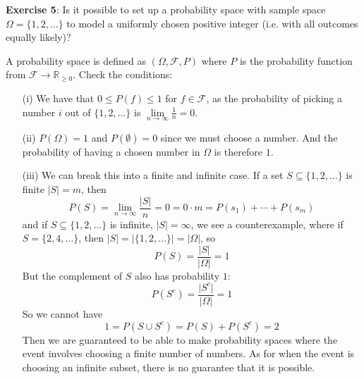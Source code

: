 \documentclass{article}
\begin{document}
\newpage

\textbf{Exercise 5}: Is it possible to set up a probability space with sample space $\Omega = \{1, 2, \ldots\}$ to model a uniformly chosen positive integer (i.e. with all outcomes equally likely)?
    \begin{answer}
        A probability space is defined as $(\Omega, \mathcal{F}, P)$ where $P$ is the probability function from $\mathcal{F} \rightarrow \mathbb{R}_{\geq 0}$. Check the conditions:
            \begin{itemize}
                \item [(i)] We have that $0 \leq P(f) \leq 1$ for $f \in \mathcal{F}$, as the probability of picking a number $i$ out of $\{1, 2, \ldots\}$ is $\lim\limits_{n \to \infty}\frac{1}{n} = 0$. 

                \item [(ii)] $P(\Omega) = 1$ and $P(\emptyset) = 0$ since we must choose a number. And the probability of having a chosen number in $\Omega$ is therefore $1$.

                \item [(iii)] We can break this into a finite and infinite case. If a set $S \subseteq \{1, 2, \ldots\}$ is finite $\lvert S \rvert = m$, then 
                    \begin{equation*}
                        P(S) = \lim\limits_{n \to \infty} \dfrac{\lvert S \rvert}{n} = 0 = 0 \cdot m = P(s_{1}) + \cdots + P(s_{m})
                    \end{equation*}
                and if $S \subseteq \{1, 2, \ldots\}$ is infinite, $\lvert S \rvert = \infty$, we see a counterexample, where if $S = \{2, 4, \ldots\}$, then $\lvert S \rvert = \lvert \{1, 2, \ldots\} \rvert = \lvert \Omega \rvert$, so 
                    \begin{equation*}
                        P(S) = \dfrac{\lvert S \rvert}{\lvert \Omega \rvert} = 1
                    \end{equation*}
                But the complement of $S$ also has probability $1$:
                    \begin{equation*}
                        P(S^{c}) = \dfrac{\lvert S^{c} \rvert}{\lvert \Omega \rvert} = 1
                    \end{equation*}
                So we cannot have
                    \begin{equation*}
                        1 = P(S \cup S^{c}) = P(S) + P(S^{c}) = 2
                    \end{equation*}
                Then we are guaranteed to be able to make probability spaces where the event involves choosing a finite number of numbers. As for when the event is choosing an infinite subset, there is no guarantee that it is possible.
            \end{itemize}
    \end{answer}
\end{document}
